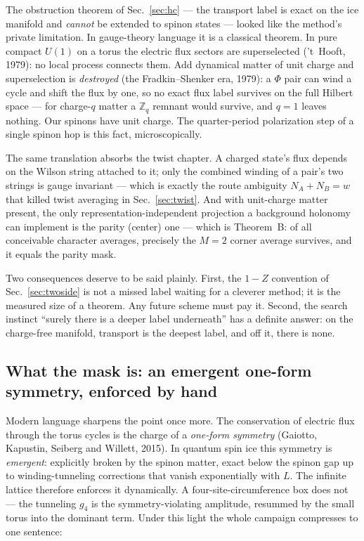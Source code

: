 \documentclass[11pt,a4paper]{article}
\newcommand{\gfour}{g_4}
\begin{document}
The obstruction theorem of Sec.~\ref{sec:hc} --- the transport label is
exact on the ice manifold and \emph{cannot} be extended to spinon states ---
looked like the method's private limitation.  In gauge-theory language it is
a classical theorem.  In pure compact $U(1)$ on a torus the electric flux
sectors are superselected ('t~Hooft, 1979): no local process connects them.
Add dynamical matter of unit charge and superselection is \emph{destroyed}
(the Fradkin--Shenker era, 1979): a $\Phi$ pair can wind a cycle and shift
the flux by one, so no exact flux label survives on the full Hilbert space
--- for charge-$q$ matter a $\mathbb{Z}_q$ remnant would survive, and $q=1$
leaves nothing.  Our spinons have unit charge.  The quarter-period
polarization step of a single spinon hop is this fact, microscopically.

The same translation absorbs the twist chapter.  A charged state's flux
depends on the Wilson string attached to it; only the combined winding of a
pair's two strings is gauge invariant --- which is exactly the route
ambiguity $N_A+N_B=w$ that killed twist averaging in
Sec.~\ref{sec:twist}.  And with unit-charge matter present, the only
representation-independent projection a background holonomy can implement is
the parity (center) one --- which is Theorem~B: of all conceivable character
averages, precisely the $M=2$ corner average survives, and it equals the
parity mask.

Two consequences deserve to be said plainly.  First, the $1-Z$ convention
of Sec.~\ref{sec:twoside} is not a missed label waiting for a cleverer
method; it is the measured size of a theorem.  Any future scheme must pay
it.  Second, the search instinct ``surely there is a deeper label
underneath'' has a definite answer: on the charge-free manifold, transport
is the deepest label, and off it, there is none.

\subsection{What the mask is: an emergent one-form symmetry, enforced by
hand}
\label{sec:oneform}

Modern language sharpens the point once more.  The conservation of electric
flux through the torus cycles is the charge of a \emph{one-form symmetry}
(Gaiotto, Kapustin, Seiberg and Willett, 2015).  In quantum spin ice this
symmetry is \emph{emergent}: explicitly broken by the spinon matter, exact
below the spinon gap up to winding-tunneling corrections that vanish
exponentially with $L$.  The infinite lattice therefore enforces it
dynamically.  A four-site-circumference box does not --- the tunneling
$\gfour$ is the symmetry-violating amplitude, resummed by the small torus
into the dominant term.  Under this light the whole campaign compresses to
one sentence:
\end{document}
